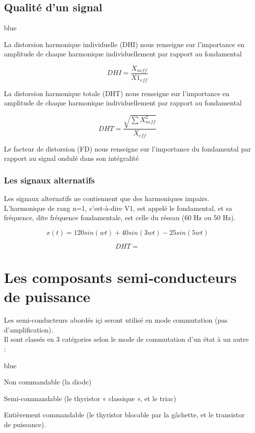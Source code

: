 {\section{Qualité d'un signal}

\begin{items}{blue}{\Triangle}
    \item La distorsion harmonique individuelle (DHI) nous renseigne sur l’importance en amplitude de chaque harmonique individuellement par rapport au fondamental

    $$ DHI = \frac{X_{neff}}{X1_{eff}}$$
    \item La distorsion harmonique totale (DHT) nous renseigne sur l’importance en amplitude de chaque harmonique individuellement par rapport au fondamental

    $$ DHT = \frac{\sqrt{ \sum X_{neff}^2}}{X_{eff}}$$
    \item Le facteur de distorsion (FD) nous renseigne sur l’importance du fondamental par rapport au signal ondulé dans son intégralité
\end{items}

\subsection{Les signaux alternatifs}

Les signaux alternatifs ne contiennent que des harmoniques impairs. L’harmonique de
rang n=1, c’est-à-dire V1, est appelé le fondamental, et sa fréquence, dite fréquence
fondamentale, est celle du réseau (60 Hz ou 50 Hz).


$$ x(t) = 120 sin(wt)+40sin(3wt)-25sin(5wt) $$



$$ DHT = $$%
\chapter{Les composants semi‐conducteurs de puissance}

Les semi-conducteurs abordés içi seront utilisé en mode commutation (pas d'amplification).\\

Il sont classés en 3 catégories selon le mode de commutation d’un état à un autre : 


\begin{items}{blue}{\Triangle}
    \item Non commandable (la diode)
    \item Semi-commandable (le thyristor « classique », et le triac)
    \item Entièrement commandable (le thyristor blocable par la gâchette, et le transistor de
    puissance).
\end{items}

}
